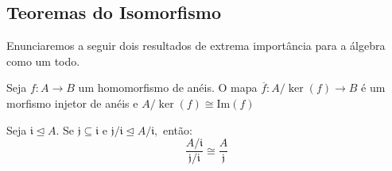 \documentclass[AlgebraII/algebraII_notes.tex]{subfiles}
\begin{document}
\subsection{Teoremas do Isomorfismo}
Enunciaremos a seguir dois resultados de extrema importância para a álgebra como um todo.
\hypertarget{first_isomorphism}{
	\begin{theorem*}
		Seja \(f:A\rightarrow B\) um homomorfismo de anéis. O mapa \(\overline{f}:A/\ker{(f)}\rightarrow B\)
		é um morfismo injetor de anéis e \(A/\ker{(f)}\cong{\mathrm{Im}(f)}\)
	\end{theorem*}}
\hypertarget{second_isomorphism}{
	\begin{theorem*}
		Seja \(\mathfrak{i}\trianglelefteq{A}.\) Se \(\mathfrak{j}\subseteq \mathfrak{i}\) e \(\mathfrak{j}/\mathfrak{i}\trianglelefteq{A/\mathfrak{i}},\) então:
		\[
			\frac{A/\mathfrak{i}}{\mathfrak{j}/\mathfrak{i}}\cong{\frac{A}{\mathfrak{j}}}
		\]
	\end{theorem*}}
\end{document}
